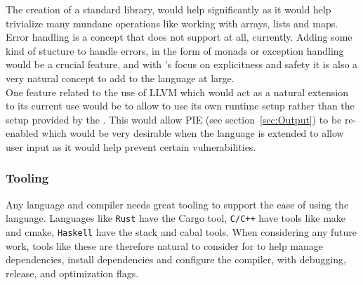 The creation of a standard library, would help \lang{} significantly as it would help
trivialize many mundane operations like working with arrays, lists and maps. \\

Error handling is a concept that \lang{} does not support at all, currently.
Adding some kind of stucture to handle errors, in the form of monads or exception
handling would be a crucial feature, and with \lang's focus on explicitness and
safety it is also a very natural concept to add to the language at large.\\

One feature related to the use of LLVM which would act as a natural extension to its
current use would be to allow \lang{} to use its own runtime setup rather than the
setup provided by the \gcc. This would allow PIE (see section~\ref{sec:Output}) to be
re-enabled which would be very desirable when the language is extended to allow user
input as it would help prevent certain vulnerabilities.

\subsubsection{Tooling} \label{sec:tooling}

Any language and compiler needs great tooling to support the ease of using the
language. Languages like \texttt{Rust} have the Cargo tool, \texttt{C/C++} have tools like make
and cmake, \texttt{Haskell} have the stack and cabal tools. When considering any
future work, tools like these are therefore natural to consider for \lang{} to help
manage dependencies, install dependencies and configure the compiler, with debugging,
release, and optimization flags. 

